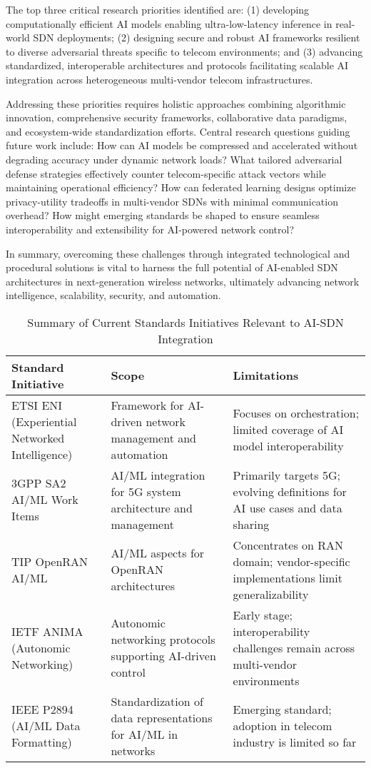 \documentclass[sigconf]{acmart}
\begin{document}
The top three critical research priorities identified are: (1) developing computationally efficient AI models enabling ultra-low-latency inference in real-world SDN deployments; (2) designing secure and robust AI frameworks resilient to diverse adversarial threats specific to telecom environments; and (3) advancing standardized, interoperable architectures and protocols facilitating scalable AI integration across heterogeneous multi-vendor telecom infrastructures.

Addressing these priorities requires holistic approaches combining algorithmic innovation, comprehensive security frameworks, collaborative data paradigms, and ecosystem-wide standardization efforts. Central research questions guiding future work include: How can AI models be compressed and accelerated without degrading accuracy under dynamic network loads? What tailored adversarial defense strategies effectively counter telecom-specific attack vectors while maintaining operational efficiency? How can federated learning designs optimize privacy-utility tradeoffs in multi-vendor SDNs with minimal communication overhead? How might emerging standards be shaped to ensure seamless interoperability and extensibility for AI-powered network control?

In summary, overcoming these challenges through integrated technological and procedural solutions is vital to harness the full potential of AI-enabled SDN architectures in next-generation wireless networks, ultimately advancing network intelligence, scalability, security, and automation.

\begin{table*}[htbp]
\centering
\caption{Summary of Current Standards Initiatives Relevant to AI-SDN Integration}
\label{tab:standards}
\begin{adjustbox}{max width=\textwidth}
\begin{tabular}{@{}lll@{}}
\toprule
\textbf{Standard Initiative} & \textbf{Scope} & \textbf{Limitations} \\ \midrule
ETSI ENI (Experiential Networked Intelligence) & Framework for AI-driven network management and automation & Focuses on orchestration; limited coverage of AI model interoperability \\ 
3GPP SA2 AI/ML Work Items & AI/ML integration for 5G system architecture and management & Primarily targets 5G; evolving definitions for AI use cases and data sharing \\
TIP OpenRAN AI/ML & AI/ML aspects for OpenRAN architectures & Concentrates on RAN domain; vendor-specific implementations limit generalizability \\
IETF ANIMA (Autonomic Networking) & Autonomic networking protocols supporting AI-driven control & Early stage; interoperability challenges remain across multi-vendor environments \\
IEEE P2894 (AI/ML Data Formatting) & Standardization of data representations for AI/ML in networks & Emerging standard; adoption in telecom industry is limited so far \\ \bottomrule
\end{tabular}
\end{adjustbox}
\end{table*}
\end{document}
